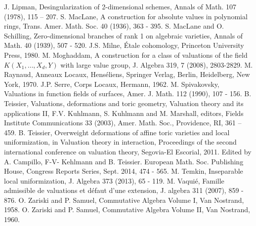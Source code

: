 \documentclass[11pt]{amsart}
\begin{document}
\begin{thebibliography}{1000000000}
 J. Lipman,  Desingularization of 2-dimensional schemes, Annals of Math. 107 (1978), 115 -- 207.
 S. MacLane,  A construction for absolute values in polynomial rings, Trans. Amer.
Math. Soc. 40 (1936), 363 - 395.
 S. MacLane and O. Schilling,  Zero-dimensional branches of rank 1 on algebraic
varieties, Annals of Math. 40 (1939), 507 - 520.
 J.S. Milne, \'Etale cohomology, Princeton University Press, 1980.
 M. Moghaddam, A construction for a class of valuations of the field $K(X_1,\ldots, X_d,Y)$ with large value group, J. Algebra 319, 7 (2008), 2803-2829.
 M. Raynaud, Anneaux Locaux, Hens\'eliens, Springer Verlag, Berlin, Heidelberg, New York, 1970.
 J.P. Serre, Corps Locaux, Hermann, 1962. 
 M. Spivakovsky, Valuations in function fields of surfaces, Amer. J. Math. 112 (1990), 107 - 156.
  B. Teissier,   Valuations, deformations and toric geometry, Valuation theory and its applications II,
F.V. Kuhlmann, S. Kuhlmann and M. Marshall, editors, Fields
Institute Communications 33 (2003), Amer. Math. Soc., Providence, RI, 361
-- 459.
 B. Teissier, Overweight deformations of affine toric varieties and local uniformization, in Valuation theory in interaction, Proceedings of the second international conference on valuation theory, Segovia-El Escorial, 2011. Edited by A. Campillo, F-V- Kehlmann and B. Teissier. European Math. Soc. Publishing House, Congress Reports Series, Sept. 2014, 474 - 565.
 M. Temkin, Inseparable local uniformization, J. Algebra 373 (2013), 65 - 119.
 M. Vaqui\'e, Famille admissible de valuations et d\'efaut d'une extension, J. algebra 311 (2007), 859 - 876.
 O. Zariski and P. Samuel, Commutative Algebra Volume I, Van Nostrand, 1958.
 O. Zariski and P. Samuel, Commutative Algebra Volume II, Van Nostrand, 1960.
\end{thebibliography}
\end{document}
